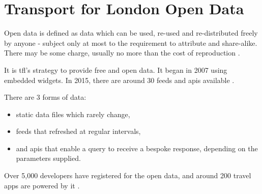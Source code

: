 \section{Transport for London Open Data}

Open data is defined as data which can be used, re-used and re-distributed freely by anyone - subject only at most to the requirement to attribute and share-alike. There may be some charge, usually no more than the cost of reproduction \cite{open_data_def}.

\par It is \acrshort{tfl}'s strategy to provide free and open data. It began in 2007 using embedded widgets\cite{open_data_start}. In 2015, there are around 30 feeds and \acrshort{api}s available \cite{open_data}.

\par There are 3 forms of data:

\begin{itemize}
  \item static data files which rarely change,
  \item feeds that refreshed at regular intervals,
  \item and \acrshort{api}s that enable a query to receive a bespoke response, depending on the parameters supplied.
\end{itemize}

Over 5,000 developers have registered for the open data\cite{open_data}, and around 200 travel apps are powered by it \cite{tfl_annual_report_13/14}.
